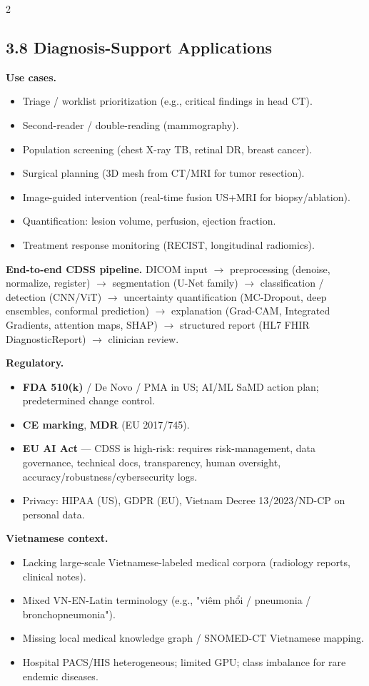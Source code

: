 \begin{paracol}{2}
\subsection*{3.8 Diagnosis-Support Applications}
\textbf{Use cases.}
\begin{itemize}[leftmargin=*,nosep]
  \item Triage / worklist prioritization (e.g., critical findings in head CT).
  \item Second-reader / double-reading (mammography).
  \item Population screening (chest X-ray TB, retinal DR, breast cancer).
  \item Surgical planning (3D mesh from CT/MRI for tumor resection).
  \item Image-guided intervention (real-time fusion US+MRI for biopsy/ablation).
  \item Quantification: lesion volume, perfusion, ejection fraction.
  \item Treatment response monitoring (RECIST, longitudinal radiomics).
\end{itemize}

\textbf{End-to-end CDSS pipeline.}
DICOM input $\to$ preprocessing (denoise, normalize, register) $\to$ segmentation (U-Net family) $\to$ classification / detection (CNN/ViT) $\to$ uncertainty quantification (MC-Dropout, deep ensembles, conformal prediction) $\to$ explanation (Grad-CAM, Integrated Gradients, attention maps, SHAP) $\to$ structured report (HL7 FHIR DiagnosticReport) $\to$ clinician review.

\textbf{Regulatory.}
\begin{itemize}[leftmargin=*,nosep]
  \item \textbf{FDA 510(k)} / De Novo / PMA in US; AI/ML SaMD action plan; predetermined change control.
  \item \textbf{CE marking}, \textbf{MDR} (EU 2017/745).
  \item \textbf{EU AI Act} — CDSS is high-risk: requires risk-management, data governance, technical docs, transparency, human oversight, accuracy/robustness/cybersecurity logs.
  \item Privacy: HIPAA (US), GDPR (EU), Vietnam Decree 13/2023/ND-CP on personal data.
\end{itemize}

\textbf{Vietnamese context.}
\begin{itemize}[leftmargin=*,nosep]
  \item Lacking large-scale Vietnamese-labeled medical corpora (radiology reports, clinical notes).
  \item Mixed VN-EN-Latin terminology (e.g., "viêm phổi / pneumonia / bronchopneumonia").
  \item Missing local medical knowledge graph / SNOMED-CT Vietnamese mapping.
  \item Hospital PACS/HIS heterogeneous; limited GPU; class imbalance for rare endemic diseases.
\end{itemize}


\end{paracol}
